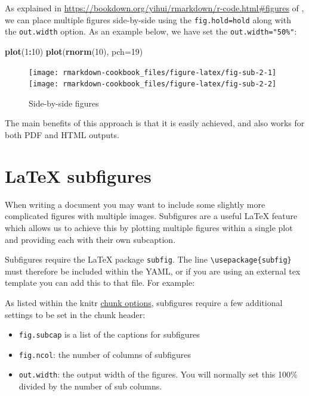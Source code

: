 \documentclass[]{book}
\newenvironment{Shaded}{\begin{snugshade}}{\end{snugshade}}
\newcommand{\KeywordTok}[1]{\textcolor[rgb]{0.13,0.29,0.53}{\textbf{#1}}}
\newcommand{\DataTypeTok}[1]{\textcolor[rgb]{0.13,0.29,0.53}{#1}}
\newcommand{\DecValTok}[1]{\textcolor[rgb]{0.00,0.00,0.81}{#1}}
\newcommand{\OperatorTok}[1]{\textcolor[rgb]{0.81,0.36,0.00}{\textbf{#1}}}
\newcommand{\NormalTok}[1]{#1}
\providecommand{\tightlist}{%
  \setlength{\itemsep}{0pt}\setlength{\parskip}{0pt}}
\begin{document}
As explained in
\url{https://bookdown.org/yihui/rmarkdown/r-code.html\#figures} of
\citet{xie2018}, we can place multiple figures side-by-side using the
\texttt{fig.hold=\textquotesingle{}hold\textquotesingle{}} along with
the \texttt{out.width} option. As an example below, we have set the
\texttt{out.width="50\%"}:

\begin{Shaded}
\begin{Highlighting}[]
\KeywordTok{plot}\NormalTok{(}\DecValTok{1}\OperatorTok{:}\DecValTok{10}\NormalTok{)}
\KeywordTok{plot}\NormalTok{(}\KeywordTok{rnorm}\NormalTok{(}\DecValTok{10}\NormalTok{), }\DataTypeTok{pch=}\DecValTok{19}\NormalTok{)}
\end{Highlighting}
\end{Shaded}

\begin{figure}
\texttt{[image: rmarkdown-cookbook\_files/figure-latex/fig-sub-2-1]} \texttt{[image: rmarkdown-cookbook\_files/figure-latex/fig-sub-2-2]} \caption{Side-by-side figures}\label{fig:fig-sub-2}
\end{figure}

The main benefits of this approach is that it is easily achieved, and
also works for both PDF and HTML outputs.

\section{LaTeX subfigures}\label{latex-subfigures}

When writing a document you may want to include some slightly more
complicated figures with multiple images. Subfigures are a useful LaTeX
feature which allows us to achieve this by plotting multiple figures
within a single plot and providing each with their own subcaption.

Subfigures require the LaTeX package \texttt{subfig}. The line
\texttt{\textbackslash{}usepackage\{subfig\}} must therefore be included
within the YAML, or if you are using an external tex template you can
add this to that file. For example:

As listed within the knitr
\href{https://yihui.name/knitr/options/}{chunk options}, subfigures
require a few additional settings to be set in the chunk header:

\begin{itemize}
\tightlist
\item
  \texttt{fig.subcap} is a list of the captions for subfigures
\item
  \texttt{fig.ncol}: the number of columns of subfigures
\item
  \texttt{out.width}: the output width of the figures. You will normally
  set this 100\% divided by the number of sub columns.
\end{itemize}
\end{document}

